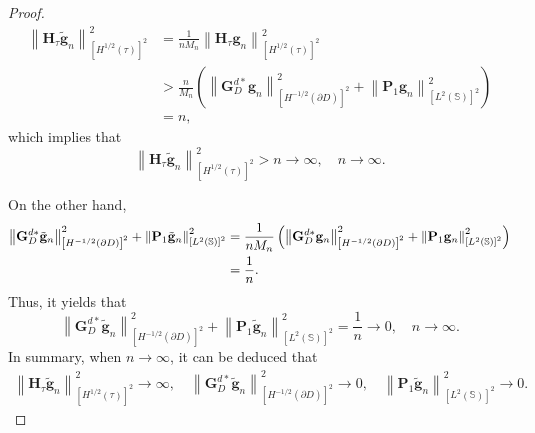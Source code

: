 \documentclass[10pt,a4paper]{amsart}
\begin{document}
\begin{proof}
\begin{equation}
\begin{aligned}
\left\| \mathbf H_{\tau} \tilde{\mathbf g}_n\right\|^2_{\left[H^{1/2}\left(\tau \right) \right] ^2 }
&= \frac{1}{n M_n} \left\| \mathbf H_{\tau} \mathbf g_n \right\|^2_{\left[H^{1/2}\left(\tau \right) \right] ^2 } \\
&>\frac{n}{M_n} \left( \left\|  \mathbf G_D^{d*} \mathbf g_n \right\|^2_{\left[H^{-1/2}\left(\partial D \right) \right] ^2}+\left\|  \mathbf P_1 \mathbf g_n \right\|^2_{\left[L^{2}\left(\mathbb S \right) \right] ^2} \right) \\
&= n,
\end{aligned}\end{equation}
which implies that 
$$
\left\| \mathbf H_{\tau} \tilde{\mathbf g}_n \right\|^2_{\left[H^{1/2}\left(\tau \right) \right] ^2 } > n \to \infty,\quad   n \to \infty .
$$

On the other hand, 
\begin{equation}\notag
\begin{aligned}
		\left\| \mathbf G_D^{d*} \tilde{\mathbf g}_n \right\|^2_{\left[H^{-1/2}\left(\partial D \right) \right] ^2}+\left\| \mathbf P_1 \tilde{\mathbf g}_n \right\|^2_{\left[L^{2}\left(\mathbb S \right) \right] ^2}
		&= \frac{1}{n M_n} \left(\left\| \mathbf G_D^{d*} \mathbf g_n \right\|^2_{\left[H^{-1/2}\left(\partial D \right) \right] ^2}+\left\| \mathbf P_1 \mathbf g_n \right\|^2_{\left[L^{2}\left(\mathbb S \right) \right] ^2} \right) \\
		&= \frac{1}{n}.
\end{aligned}\end{equation}
Thus, it yields that 
$$
\left\| \mathbf G_D^{d*} \tilde{\mathbf g}_n \right\|^2_{\left[H^{-1/2}\left(\partial D \right) \right] ^2}+\left\| \mathbf P_1 \tilde{\mathbf g}_n \right\|^2_{\left[L^{2}\left(\mathbb S \right) \right] ^2}= \frac{1}{n} \to 0, \quad n \to \infty .
$$
In summary, when $n \to \infty $, it can be deduced that
\begin{equation}\begin{aligned}\label{eq:HGPasymptotic}
  \left\| \mathbf H_{\tau} \tilde{\mathbf g}_n \right\|^2_{\left[H^{1/2}\left(\tau \right) \right] ^2 } \to \infty ,\quad \left\| \mathbf G_D^{d*} \tilde{\mathbf g}_n \right\|^2_{\left[H^{-1/2}\left(\partial D \right) \right] ^2} \to 0,\quad \left\| \mathbf P_1 \tilde{\mathbf g}_n \right\|^2_{\left[L^{2}\left(\mathbb S \right) \right] ^2} \to 0.
 \end{aligned}\end{equation}


\end{proof}
\end{document}

